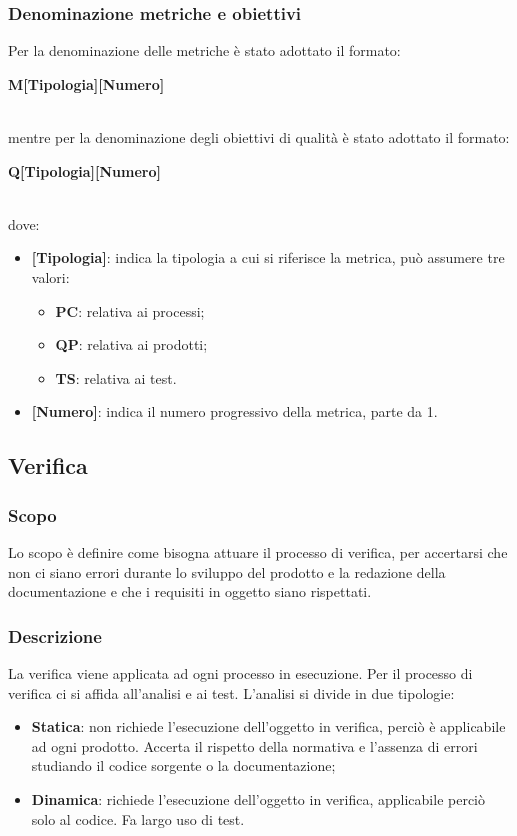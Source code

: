 \subsubsection{Denominazione metriche e obiettivi}
Per la denominazione delle metriche è stato adottato il formato: \\
\centerline{\textbf{M[Tipologia][Numero]}} \\
mentre per la denominazione degli obiettivi di qualità è stato adottato il formato: \\
\centerline{\textbf{Q[Tipologia][Numero]}} \\
dove:
\begin{itemize}
\item \textbf{[Tipologia]}: indica la tipologia a cui si riferisce la metrica, può assumere tre valori:
    \begin{itemize}
    \item \textbf{PC}: relativa ai processi; 
    \item \textbf{QP}: relativa ai prodotti;
    \item \textbf{TS}: relativa ai test.
    \end{itemize}
\item \textbf{[Numero]}: indica il numero progressivo della metrica, parte da 1.
\end{itemize}




\subsection{Verifica}
\subsubsection{Scopo}
Lo scopo è definire come bisogna attuare il processo di verifica, per accertarsi che non ci siano errori durante lo sviluppo del prodotto e la redazione della documentazione e che i requisiti in oggetto siano rispettati. 

\subsubsection{Descrizione}
La verifica viene applicata ad ogni processo in esecuzione. Per il processo di verifica ci si affida all'analisi e ai test. L'analisi si divide in due tipologie:
\begin{itemize}
\item \textbf{Statica}: non richiede l'esecuzione dell'oggetto in verifica, perciò è applicabile ad ogni prodotto. Accerta il rispetto della normativa e l'assenza di errori studiando il codice sorgente o la documentazione;
\item \textbf{Dinamica}: richiede l'esecuzione dell'oggetto in verifica, applicabile perciò solo al codice. Fa largo uso di test.
\end{itemize}

